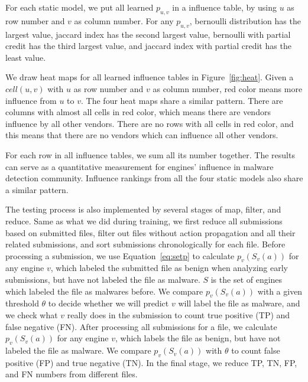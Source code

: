 For each static model, 
we put all learned $p_{u,v}$ in a influence table, 
by using $u$ as row number and $v$ as column number.
For any $p_{u,v}$, bernoulli distribution has the largest value, 
jaccard index has the second largest value, 
bernoulli with partial credit has the third largest value,
and jaccard index with partial credit has the least value. 



We draw heat maps for all learned influence tables in Figure~\ref{fig:heat}. 
Given a $cell(u, v)$ with $u$ as row number and $v$ as column number, 
red color means more influence from $u$ to $v$. 
The four heat maps share a similar pattern.
There are columns with almost all cells in red color, 
which means there are vendors influence by all other vendors. 
There are no rows with all cells in red color, 
and this means that there are no vendors which can influence all other vendors. 

For each row in all influence tables, we sum all its number together. 
The results can serve as a quantitative measurement for engines' influence in malware detection community. 
Influence rankings from all the four static models also share a similar pattern. 

The testing process is also implemented by several stages of map, filter, and reduce.
Same as what we did during training, 
we first reduce all submissions based on submitted files, 
filter out files without action propagation and all their related submissions, 
and sort submissions chronologically for each file. 
Before processing a submission, we use Equation~\ref{eq:setp} to
calculate $p_v(S_v(a))$ for any engine $v$, 
which labeled the submitted file as benign when analyzing early submissions, 
but have not labeled the file as malware. 
$S$ is the set of engines which labeled the file as malwares before.
We compare $p_v(S_v(a))$ with a given threshold $\theta$ to decide whether we will predict 
$v$ will label the file as malware, and we check what $v$ 
really does in the submission to count true positive (TP) and false negative (FN). 
After processing all submissions for a file, 
we calculate $p_v(S_v(a))$ for any engine $v$, 
which labels the file as benign, but have not labeled the file as malware.
We compare $p_v(S_v(a))$ with $\theta$ to count false positive (FP) and true negative (TN).
In the final stage, we reduce TP, TN, FP, and FN numbers from different files.




